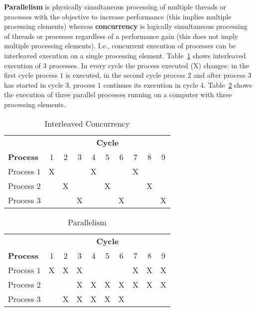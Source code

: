 \textbf{Parallelism} is physically simultaneous processing of multiple
threads or processes with the objective
to increase performance (this implies multiple processing elements)
whereas \textbf{concurrency} is logically simultaneous processing of
threads or processes regardless of a performance gain (this does not
imply multiple processing elements). I.e., concurrent execution of
processes can be interleaved execution on a single processing
element. Table~\ref{tab:concurrency} shows interleaved execution of 3
processes. In every cycle the process executed (X) changes: in the
first cycle process $1$ is executed, in the second cycle process $2$
and after process $3$ has started in cycle $3$, process $1$ continues
its execution in cycle $4$. Table~\ref{tab:parallelism} shows the
execution of three parallel processes running on a computer with three
processing elements. 

\begin{table}[h!b!p!]
\caption{Interleaved Concurrency}
\centering
\begin{tabular}{|l|c|c|c|c|c|c|c|c|c|}
\hline
 & \multicolumn{9}{|c|}{\textbf{Cycle}} \\
\textbf{Process}
	& 1
	& 2
	& 3
        & 4
        & 5
        & 6
        & 7
        & 8
        & 9
        \\ \hline 
Process $1$ & X &   &   & X &   &   & X &   &   \\ \hline
Process $2$ &   & X &   &   & X &   &   & X &   \\ \hline
Process $3$ &   &   & X &   &   & X &   &   & X \\ \hline
\end{tabular}
\label{tab:concurrency}
\end{table}

\begin{table}[h!b!p!]
\caption{Parallelism}
\centering
\begin{tabular}{|l|c|c|c|c|c|c|c|c|c|}
\hline
 & \multicolumn{9}{|c|}{\textbf{Cycle}} \\
\textbf{Process}
	& 1
	& 2
	& 3
        & 4
        & 5
        & 6
        & 7
        & 8
        & 9
        \\ \hline 
Process $1$ & X & X & X &   &   &   & X & X & X \\ \hline
Process $2$ &   &   & X & X & X & X & X & X & X \\ \hline
Process $3$ &   & X & X & X & X & X &   &   &   \\ \hline
\end{tabular}
\label{tab:parallelism}
\end{table}

